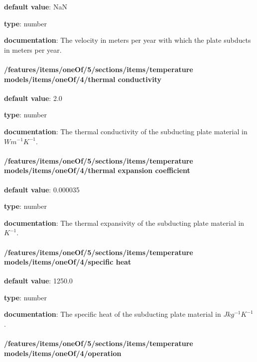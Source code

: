 \begin{itemized}
\item {\bf default value}: NaN
\item {\bf type}: number
\item {\bf documentation}: The velocity in meters per year with which the plate subducts in meters per year.
\end{itemized}\paragraph{/features/items/oneOf/5/sections/items/temperature models/items/oneOf/4/thermal conductivity} \begin{itemized}
\item {\bf default value}: 2.0
\item {\bf type}: number
\item {\bf documentation}: The thermal conductivity of the subducting plate material in $W m^{-1} K^{-1}$.
\end{itemized}\paragraph{/features/items/oneOf/5/sections/items/temperature models/items/oneOf/4/thermal expansion coefficient} \begin{itemized}
\item {\bf default value}: 0.000035
\item {\bf type}: number
\item {\bf documentation}: The thermal expansivity of the subducting plate material in $K^{-1}$.
\end{itemized}\paragraph{/features/items/oneOf/5/sections/items/temperature models/items/oneOf/4/specific heat} \begin{itemized}
\item {\bf default value}: 1250.0
\item {\bf type}: number
\item {\bf documentation}: The specific heat of the subducting plate material in $J kg^{-1} K^{-1}$.
\end{itemized}\paragraph{/features/items/oneOf/5/sections/items/temperature models/items/oneOf/4/operation} \begin{itemized}

\end{itemized}
